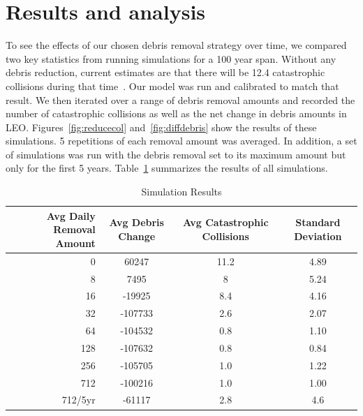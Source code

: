 \documentclass[pre,12pt]{revtex4-1}
\begin{document}
\section{Results and analysis}\label{Results}

To see the effects of our chosen debris removal strategy over time, we compared two key statistics from running simulations for a 100 year span. Without any debris reduction, current estimates are that there will be 12.4 catastrophic collisions during that time~\cite{CollisionProbs}. Our model was run and calibrated to match that result. We then iterated over a range of debris removal amounts and recorded the number of catastrophic collisions as well as the net change in debris amounts in LEO. Figures~\ref{fig:reducecol} and~\ref{fig:diffdebris} show the results of these simulations. 5 repetitions of each removal amount was averaged. In addition, a set of simulations was run with the debris removal set to its maximum amount but only for the first 5 years. Table~\ref{tab:results} summarizes the results of all simulations.

\begin{table}[h]
\centering
\begin{tabular}{| r | c| c| c|} \hline
	Avg Daily Removal Amount & Avg Debris Change & Avg Catastrophic Collisions & Standard Deviation \\ \hline
	0 & 60247 & 11.2 & 4.89 \\ \hline
	8 & 7495 & 8 & 5.24 \\ \hline
	16 & -19925 & 8.4 & 4.16 \\ \hline
	32 & -107733 & 2.6 & 2.07 \\ \hline
	64 & -104532 & 0.8 & 1.10 \\ \hline
	128 & -107632 & 0.8 & 0.84 \\ \hline
	256 & -105705 & 1.0 & 1.22 \\ \hline
	712 & -100216 & 1.0 & 1.00 \\ \hline
	712/5yr & -61117 & 2.8 & 4.6 \\ \hline
\end{tabular}
\caption{Simulation Results}
\label{tab:results}
\end{table}
\end{document}

